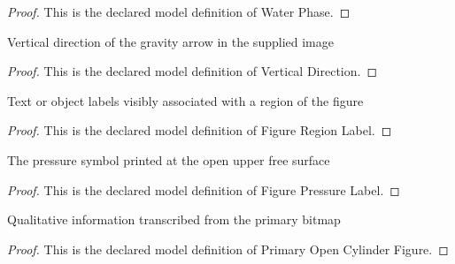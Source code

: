 \begin{proof}
  This is the declared model definition of Water Phase.
\end{proof}
\begin{definition}
  \label{def:physics:phyx-mini-0453:phyxminiproblems-problemphyxmini0453-verticaldirection}
  Vertical direction of the gravity arrow in the supplied image
\end{definition}
\begin{proof}
  This is the declared model definition of Vertical Direction.
\end{proof}
\begin{definition}
  \label{def:physics:phyx-mini-0453:phyxminiproblems-problemphyxmini0453-figureregionlabel}
  Text or object labels visibly associated with a region of the figure
\end{definition}
\begin{proof}
  This is the declared model definition of Figure Region Label.
\end{proof}
\begin{definition}
  \label{def:physics:phyx-mini-0453:phyxminiproblems-problemphyxmini0453-figurepressurelabel}
  The pressure symbol printed at the open upper free surface
\end{definition}
\begin{proof}
  This is the declared model definition of Figure Pressure Label.
\end{proof}
\begin{definition}
  \label{def:physics:phyx-mini-0453:phyxminiproblems-problemphyxmini0453-primaryopencylinderfigure}
  Qualitative information transcribed from the primary bitmap
\end{definition}
\begin{proof}
  This is the declared model definition of Primary Open Cylinder Figure.
\end{proof}
